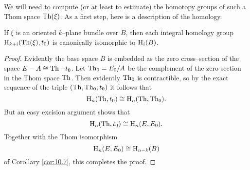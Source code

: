 \documentclass[../main]{subfiles}
\begin{document}
We will need to compute (or at least to estimate) the homotopy groups of such a Thom space $\operatorname{Th}(\xi)$. As a first step, here is a description of the homology.

\begin{lemma}\label{lem:18.2}
If $\xi$ is an oriented $k$--plane bundle over $B$, then each integral homology group $\operatorname{H}_{k + i}(\operatorname{Th}(\xi), t_0)$ is canonically isomorphic to $\operatorname{H}_i(B)$. 
\end{lemma}

\begin{proof}
Evidently the base space $B$ is embedded as the zero cross--section of the space $E - A \cong \operatorname{Th} - t_0$. Let $\operatorname{Th}_0 = E_0/A$ be the complement of the zero section in the Thom space $\operatorname{Th}$. Then evidently $\operatorname{Th}_0$ is contractible, so by the exact sequence of the triple $(\operatorname{Th}, \operatorname{Th}_0, t_0)$ it follows that \[\operatorname{H}_n(\operatorname{Th}, t_0) \cong \operatorname{H}_n(\operatorname{Th}, \operatorname{Th}_0).\] But an easy excision argument shows that \[\operatorname{H}_n(\operatorname{Th}, t_0) \cong \operatorname{H}_n(E, E_0).\] Together with the Thom isomorphism \[\operatorname{H}_n(E, E_0) \cong \operatorname{H}_{n - k}(B)\] of Corollary \ref{cor:10.7}, this completes the proof.
\end{proof}
\end{document}
